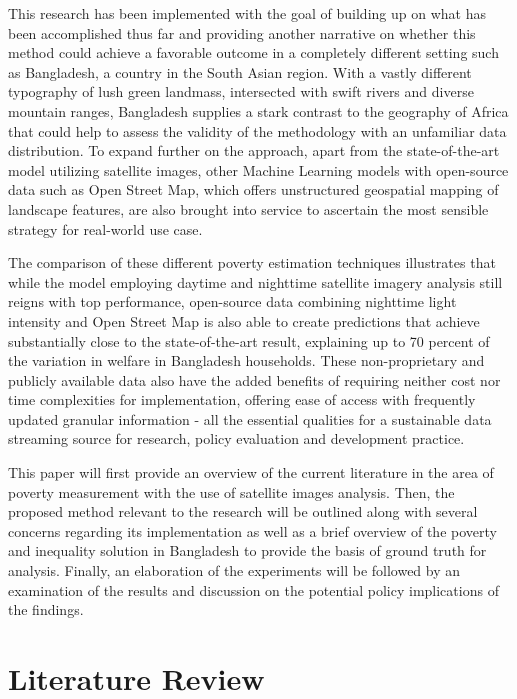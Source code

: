 \documentclass[solid,math,chem,code,plot,gloss]{bmc}
\begin{document}
This research has been implemented with the goal of building up on what has been accomplished thus far and providing another narrative on whether this method could achieve a favorable outcome in a completely different setting such as Bangladesh, a country in the South Asian region. With a vastly different typography of lush green landmass, intersected with swift rivers and diverse mountain ranges, Bangladesh supplies a stark contrast to the geography of Africa that could help to assess the validity of the methodology with an unfamiliar data distribution. To expand further on the approach, apart from the state-of-the-art model utilizing satellite images, other Machine Learning models with open-source data such as Open Street Map, which offers unstructured geospatial mapping of landscape features, are also brought into service to ascertain the most sensible strategy for real-world use case. 

The comparison of these different poverty estimation techniques illustrates that while the model employing daytime and nighttime satellite imagery analysis still reigns with top performance, open-source data combining nighttime light intensity and Open Street Map is also able to create predictions that achieve substantially close to the state-of-the-art result, explaining up to 70 percent of the variation in welfare in Bangladesh households. These non-proprietary and publicly available data also have the added benefits of requiring neither cost nor time complexities for implementation, offering ease of access with frequently updated granular information - all the essential qualities for a sustainable data streaming source for research, policy evaluation and development practice. 

This paper will first provide an overview of the current literature in the area of poverty measurement with the use of satellite images analysis. Then, the proposed method relevant to the research will be outlined along with several concerns regarding its implementation as well as a brief overview of the poverty and inequality solution in Bangladesh to provide the basis of ground truth for analysis. Finally, an elaboration of the experiments will be followed by an examination of the results and discussion on the potential policy implications of the findings. 

\newpage

\chapter{Literature Review}
\end{document}
